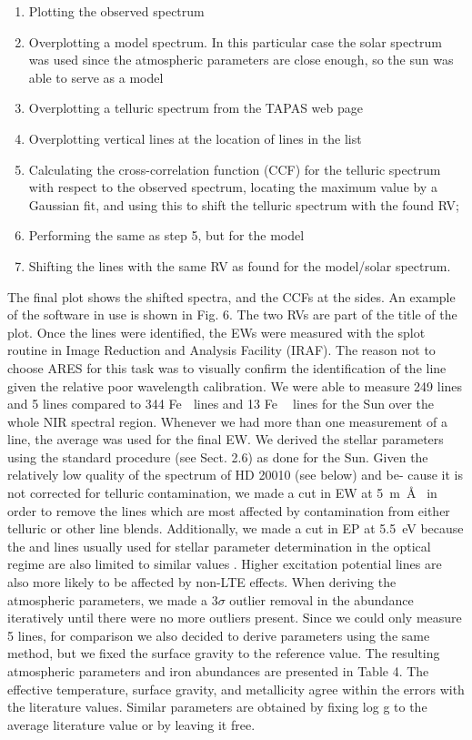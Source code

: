 \begin{enumerate}
  \item Plotting the observed spectrum
  \item Overplotting a model spectrum. In this particular case the solar spectrum was used since the
        atmospheric parameters are close enough, so the sun was able to serve as a model
  \item Overplotting a telluric spectrum from the TAPAS web page \citep{Bertaux2014}
  \item Overplotting vertical lines at the location of lines in the list
  \item Calculating the cross-correlation function (CCF) for the telluric spectrum with respect to
        the observed spectrum, locating the maximum value by a Gaussian fit, and using this to shift
        the telluric spectrum with the found RV;
  \item Performing the same as step 5, but for the model
  \item Shifting the lines with the same RV as found for the model/solar spectrum.
\end{enumerate}

The final plot shows the shifted spectra, and the CCFs at the sides. An example of the software in
use is shown in Fig. 6. The two RVs are part of the title of the plot. Once the lines were
identified, the EWs were measured with the splot routine in Image Reduction and Analysis Facility
(IRAF). The reason not to choose ARES for this task was to visually confirm the identification of
the line given the relative poor wavelength calibration. We were able to measure 249 
lines and 5  lines compared to 344 Fe  lines and 13 Fe  lines for the Sun over the
whole NIR spectral region. Whenever we had more than one measurement of a line, the average was used
for the final EW. We derived the stellar parameters using the standard procedure (see Sect. 2.6) as
done for the Sun. Given the relatively low quality of the spectrum of HD 20010 (see below) and be-
cause it is not corrected for telluric contamination, we made a cut in EW at \SI{5}{m\AA{}} in order
to remove the lines which are most affected by contamination from either telluric or other line
blends. Additionally, we made a cut in EP at \SI{5.5}{eV} because the  and 
lines usually used for stellar parameter determination in the optical regime are also limited to
similar values \citep[see e.g][]{Sousa2008}. Higher excitation potential lines are also more likely
to be affected by non-LTE effects. When deriving the atmospheric parameters, we made a $3\sigma$
outlier removal in the abundance iteratively until there were no more outliers present. Since we
could only measure 5  lines, for comparison we also decided to derive parameters using
the same method, but we fixed the surface gravity to the reference value. The resulting
atmospheric parameters and iron abundances are presented in Table 4. The effective temperature,
surface gravity, and metallicity agree within the errors with the literature values. Similar
parameters are obtained by fixing log g to the average literature value or by leaving it free.


